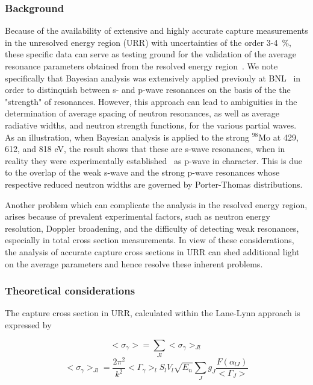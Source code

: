 \documentclass[twocolumn,amsmath,amssymb,10pt,groupedaddress,a4paper]{revtex4}
\begin{document}
\subsubsection{Background}
Because of the availability of extensive and  highly accurate capture measurements in the unresolved energy region (URR) with uncertainties of  the order 3-4~\%, these specific data can serve as testing ground for the validation of the average resonance parameters obtained from  the resolved energy region~\cite{Mughabghab:06}. We note specifically  that Bayesian analysis was extensively applied previouly at BNL~\cite{Mughabghab:06,Oh:00} in order to distinquish between s- and p-wave resonances on the basis of the the "strength" of resonances. However, this approach can lead to ambiguities in the determination  of  average spacing of neutron resonances, as well as   average radiative widths, and  neutron strength functions, for the various partial waves. As an illustration, when Bayesian analysis is applied  to the strong $^{98}$Mo at 429, 612, and 818 eV, the result  shows that these are s-wave resonances, when in reality they were experimentally established~\cite{Mughabghab:71} as p-wave in character. This is due to the overlap of the weak s-wave and the strong p-wave resonances whose respective reduced neutron widths are governed by Porter-Thomas distributions.

Another problem which  can complicate the analysis in the resolved energy region, arises because of  prevalent experimental  factors, such as neutron energy resolution, Doppler broadening, and  the difficulty of detecting weak resonances, especially in total cross section measurements. In view of these considerations, the analysis of accurate capture cross sections in URR can shed additional light on the average parameters and hence resolve these inherent problems.

\subsubsection{Theoretical considerations}
 The capture cross section in URR, calculated  within the Lane-Lynn approach is expressed by

\begin{equation}
<\sigma_\gamma>= \sum_{Jl}<\sigma_\gamma>_{Jl}
\end{equation}
\begin{equation}
<\sigma_\gamma>_{Jl} = \frac{2\pi^2}{k^2}<\Gamma_{\gamma}>_l S_l V_l \sqrt{E_n}\sum_Jg_J\frac{F(\alpha_{lJ})}{<\Gamma_J>}
\end{equation}
\end{document}
